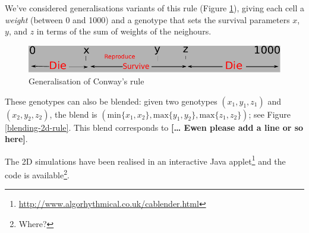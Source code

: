 \documentclass{AISB2008}
\begin{document}
We've considered generalisations variants of this rule (Figure
\ref{generalised-conway-rule}), giving each cell a \emph{weight}
(between 0 and 1000) and a genotype that sets the survival parameters
$x$, $y$, and $z$ in terms of the sum of weights of the neighours.
\begin{figure}[!ht]
\includegraphics[width=\columnwidth]{2dgenotype}
\caption{Generalisation of Conway's rule\label{generalised-conway-rule}}
\end{figure}

These genotypes can also be blended: given two genotypes $(x_1, y_1,
z_1)$ and $(x_2, y_2, z_2)$, the blend is $(\mathrm{min} \{x_1,x_2\},
\mathrm{max} \{y_1,y_2\}, \mathrm{max} \{z_1,z_2\})$; see Figure
\ref{blending-2d-rule}.  This blend corresponds to \textbf{[\ldots
    Ewen please add a line or so here]}.

The 2D simulations have been realised in an interactive Java
applet\footnote{\url{http://www.algorhythmical.co.uk/cablender.html}}
and the code is available\footnote{Where?}.

\FloatBarrier
\newpage
\end{document}
